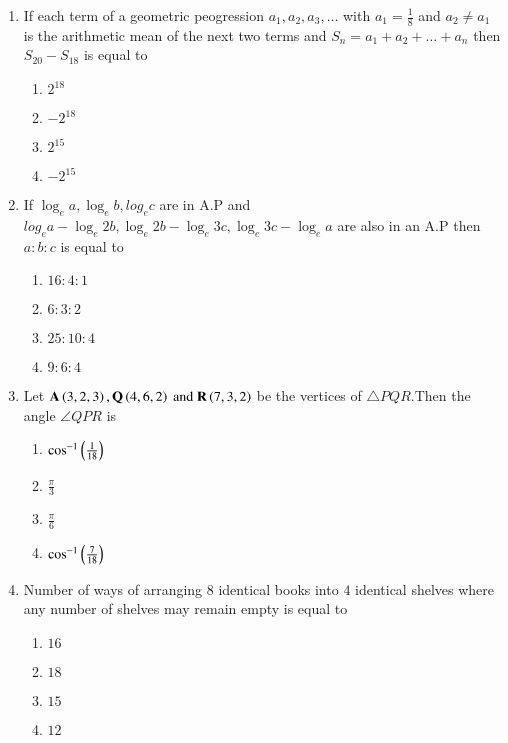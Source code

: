 \documentclass[journal]{IEEEtran}
\begin{document}
\begin{enumerate}
\item If each term of a geometric peogression $a_1 , a_2 , a_3 ,\dots $ with $a_1 = \frac{1}{8}$ and $a_2 \neq a_1 $ is the arithmetic mean of the next two terms and $S_n = a_1 + a_2 + \dots + a_n$ then $S_{20} - S_{18}$ is equal to
	\begin{multicols}{2}
		\begin{enumerate}
			\item $2^{18}$
			\item $-2^{18}$
			\item $2^{15}$
			\item $-2^{15}$
		\end{enumerate}
	\end{multicols}
\item If $\log_e a , \log_e b , log_e c $ are in A.P and $log_e{a} - \log_e{2b} , \log_e{2b} - \log_e{3c} , \log_e{3c} - \log_e{a}$ are also in an A.P then $a \colon b \colon c$ is equal to
	\begin{enumerate}
		\item $16 \colon 4 \colon 1$
		\item $6 \colon 3 \colon 2$
		\item $25 \colon 10 \colon 4$
		\item $9 \colon 6 \colon 4$\\
	\end{enumerate}
\item Let $\mathbf{A} \left( 3 , 2 ,3\right) , \mathbf{Q}\left(4 , 6 ,2\right) \text{ and } \mathbf{R}\left( 7 , 3 ,2\right)$ be the vertices of $\triangle {PQR}$.Then the angle $\angle{QPR}$ is
	\begin{enumerate}
		\item $\cos ^{-1}\left(\frac{1}{18}\right)$
		\item $\frac{\pi}{3}$
		\item $\frac{\pi}{6}$
		\item $\cos^{-1}\left(\frac{7}{18}\right)$
	\end{enumerate}
\item Number of ways of arranging $8$ identical books into $4$ identical shelves where any number of shelves may remain empty is equal to 
	\begin{multicols}{2}
		\begin{enumerate}
			\item $16$
			\item $18$
			\item $15$
			\item $12$
		\end{enumerate}

\end{multicols}
\end{enumerate}
\end{document}
